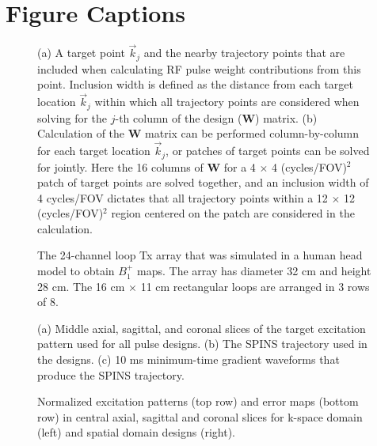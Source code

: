 \documentclass[11pt]{article}
\renewcommand{\textcolor}[1]{}
\begin{document}
\pagebreak

\section*{Figure Captions}

\begin{figure}[!h]
	\centering
	\caption{(a) A target point $\vec{k}_j$ and the nearby trajectory points that are included when calculating 
	RF pulse weight contributions from this point.
	Inclusion width is defined as the distance from each target location $\vec{k}_j$ within which all trajectory points are considered when solving for the $j$-th column of the design ($\bm{W}$) matrix.
	(b) Calculation of the $\bm{W}$ matrix can be performed column-by-column for each target location $\vec{k}_j$,
	or patches of target points can be solved for jointly. 
	Here the 16 columns of $\bm{W}$ for a 4 $\times$ 4 (cycles/FOV)$^2$ patch of target points are solved together,
	and an inclusion width of 4 cycles/FOV dictates that all trajectory points within a 12 $\times$ 12 (cycles/FOV)$^2$ region
	centered on the patch are considered in the calculation.}
	\label{fig:Patch}
\end{figure}

\begin{figure}[!h]
	\centering
	\caption{The 24-channel loop Tx array that was simulated in a human head model to obtain $B_1^+$ maps. 
	The array has diameter 32 cm and height 28 cm. The 16 cm $\times$ 11 cm rectangular loops are arranged in 3 rows of 8.}
	\label{fig:Coil}
\end{figure}

\begin{figure}[!h]
	\centering
	\caption{(a) Middle axial, sagittal, and coronal slices of the target excitation pattern used for all pulse designs. 
	(b) The SPINS trajectory used in the designs. 
	(c) 10 ms minimum-time gradient waveforms that produce the SPINS trajectory.}
	\label{fig:Target}
\end{figure}

\begin{figure}[!h]
	\centering
	\caption{ %
	Normalized excitation patterns (top row) and error maps (bottom row) in central axial, sagittal and coronal slices 
	for k-space domain (left) and spatial domain designs (right).}
	\label{fig:ErrorMap}
\end{figure}
\end{document}
